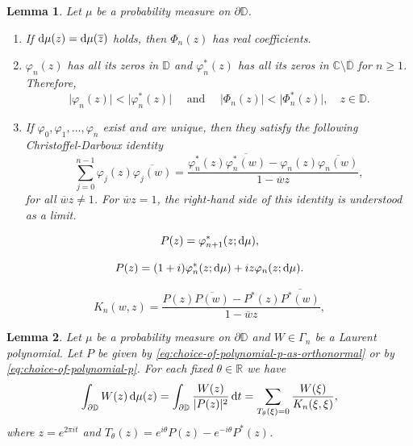 \documentclass[10pt,a4paper]{amsart}
\newtheorem{lemma}{Lemma}
\def\C{\mathbb{C}}
\def\R{\mathbb{R}}
\renewcommand{\d}{\text{\rm d}}
\newcommand{\dD}{\partial\mathbb{D}}
\begin{document}
\begin{lemma}\label{lem:properties of orthogonal polynomials}
    Let $\mu$ be a probability measure on $\dD$.
    \begin{enumerate}[label=\textnormal{(\roman*)}]
        \item If $\d\mu(z)=\d\mu(\overline{z})$ holds,  then $\Phi_n(z)$ has real coefficients.
        \item $\varphi_n(z)$ has all its zeros in $\mathbb{D}$ and $\varphi^*_n(z)$ has all its zeros in $\C\setminus\overline{\mathbb{D}}$ for $n \geq 1$. Therefore, 
        \begin{equation*}
            \lvert \varphi_n(z)\rvert <\lvert \varphi_n^*(z)\rvert \quad \text{ and }\quad \lvert \Phi_n(z)\rvert <\lvert \Phi_n^*(z)\rvert, \quad z\in \mathbb{D}.
        \end{equation*}
        \item If $\varphi_0, \varphi_1, \ldots, \varphi_n$ exist and are unique, then they satisfy the following Christoffel-Darboux identity
        \begin{equation*}
            \sum_{j=0}^{n-1} \varphi_j(z)\overline{\varphi_j(w)}=\frac{\varphi_n^*(z)\overline{\varphi_n^*(w)}-\varphi_n(z)\overline{\varphi_n(w)}}{1-\overline{w}z},
        \end{equation*}
        for all $\overline{w}z\neq 1$. For $\overline{w}z=1$, the right-hand side of this identity is understood as a limit.
    \end{enumerate}
\end{lemma}

\begin{equation}\label{eq:choice-of-polynomial-p-as-orthonormal}
    P(z)=\varphi_{n+1}^*(z;\d\mu),    
\end{equation}

\begin{equation}\label{eq:choice-of-polynomial-p}
    P(z)=(1+i)\varphi_{n}^*(z;\d\mu) + i z \varphi_{n}(z;\d\mu).
\end{equation}

\begin{equation}\label{eq:reproducing-kernel-formula}
    K_n(w, z)=\frac{P(z) \overline{P(w)}-P^*(z) \overline{P^*(w)}}{1-\overline{w}z},
\end{equation}

\begin{lemma}\label{lem:quadrature-formula-for-laurent-polynomials}
Let $\mu$ be a probability measure on $\dD$ and $W\in \Gamma_n$ be a Laurent polynomial. Let $P$ be given by \eqref{eq:choice-of-polynomial-p-as-orthonormal} or by \eqref{eq:choice-of-polynomial-p}. For each fixed $\theta\in \R$ we have 
\begin{equation}\label{eq:quadrature formula for W}
    \int_{\dD} W(z)\, \d\mu(z)=\int_{\dD}\frac{W(z)}{|P(z)|^2}\,\d t=\sum_{T_\theta(\xi)=0}\frac{W(\xi)}{K_{n}(\xi, \xi)},
\end{equation}
where $z=e^{2\pi i t}$ and $T_\theta(z)=e^{i\theta}P(z)-e^{-i\theta}P^*(z)$.
\end{lemma}
\end{document}
